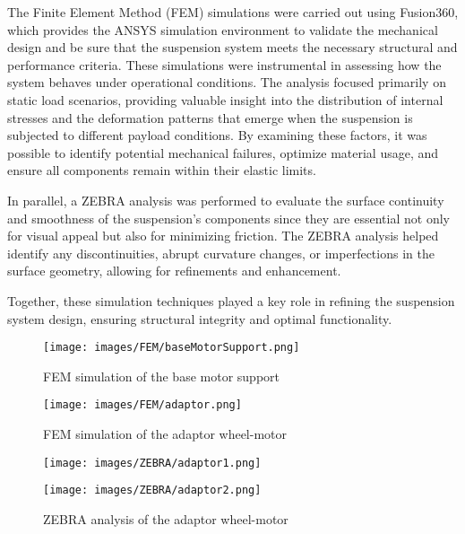 \documentclass[11pt]{article}
\begin{document}
The Finite Element Method (FEM) simulations were carried out using Fusion360, which provides the ANSYS simulation environment to validate the mechanical design and be sure that the suspension system meets the necessary structural and performance criteria. These simulations were instrumental in assessing how the system behaves under operational conditions. The analysis focused primarily on static load scenarios, providing valuable insight into the distribution of internal stresses and the deformation patterns that emerge when the suspension is subjected to different payload conditions. By examining these factors, it was possible to identify potential mechanical failures, optimize material usage, and ensure all components remain within their elastic limits.

In parallel, a ZEBRA analysis was performed to evaluate the surface continuity and smoothness of the suspension's components since they are essential not only for visual appeal but also for minimizing friction. The ZEBRA analysis helped identify any discontinuities, abrupt curvature changes, or imperfections in the surface geometry, allowing for refinements and enhancement.

Together, these simulation techniques played a key role in refining the suspension system design, ensuring structural integrity and optimal functionality.

\begin{figure}[H]
    \centering
    \texttt{[image: images/FEM/baseMotorSupport.png]}
    \caption{FEM simulation of the base motor support}
    \label{fig:fem_base_motor_support}
\end{figure}

\begin{figure}[H]
    \centering
    \texttt{[image: images/FEM/adaptor.png]}
    \caption{FEM simulation of the adaptor wheel-motor}
    \label{fig:fem_adaptor_wheel_motor}
\end{figure}

\begin{figure}[H]
    \centering
    \begin{minipage}{0.45\textwidth}
        \texttt{[image: images/ZEBRA/adaptor1.png]}
        \label{fig:zebra_adaptor_wheel_motor}
    \end{minipage}
    \hfill
    \begin{minipage}{0.45\textwidth}
        \texttt{[image: images/ZEBRA/adaptor2.png]}
        \label{fig:zebra_adaptor_wheel_motor2}
    \end{minipage}
    \caption{ZEBRA analysis of the adaptor wheel-motor}
\end{figure}
\end{document}
